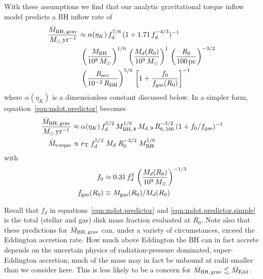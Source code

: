 \documentclass[11pt,a4paper]{article}
\begin{document}
With these assumptions we find that our analytic gravitational torque inflow model predicts a BH inflow rate of 
\begin{align}
\label{eqn:mdot.predictor}
\frac{\dot{M}_{\rm BH,\,grav}}{M_{\odot}\,{\rm yr^{-1}}} &\approx \alpha(\eta_{K}) \,  f_{d}^{7/6}\,(1+1.71\,f_{d}^{-4/3})^{-1}\,\\
                                                          \nonumber &\ \left( \frac{M_{\rm BH}}{10^{8}\,M_{\odot}} \right)^{1/6}\,     
                                                                                   \left( \frac{M_{d}(R_{0})}{10^{9}\,M_{\odot}} \right)^{1}\, 
                                                                                  \left( \frac{R_{0}}{100\,{\rm pc}} \right)^{-3/2}\,\\
                                                     \nonumber &\ \nonumber \left( \frac{R_{\rm acc}}{10^{-2}\,R_{\rm BH}} \right)^{5/6}\,      
                                                                                                {\left[1+\frac{f_{0}}{f_{\rm gas}(R_{0})}\right]^{-1}} \nonumber 
\end{align}
where $\alpha(\eta_K)$ is a dimensionless constant discussed below.
In a simpler form, equation~\ref{eqn:mdot.predictor} becomes
\begin{align}
    \label{eqn:mdot.predictor.simple}
  \frac{\dot{M}_{\rm BH,\,grav}}{M_{\odot}\,{\rm yr^{-1}}} 
                                & \approx  \alpha(\eta_K)\,  f_{d}^{5/2}\,   M_{\rm BH,\,8}^{1/6}\,M_{d,\,9}\,R_{0,\,100}^{-3/2}\,(1+f_{0}/f_{\rm gas})^{-1}  \\
  \dot{M}_{\rm torque} & \propto  e_{\rm T}            \;  f_{d}^{5/2}  \; M_{d}                  \;  R_{0}^{-3/2}   \; M_{\rm BH}^{1/6}
\end{align}
with
\begin{align}
    f_{0}                  &\approx 0.31\,f_{d}^{2}\,\left( \frac{M_{d}(R_0)}{10^{9}\,M_{\odot}} \right)^{-1/3} \\ 
  f_{\rm gas}(R_{0}) &\equiv M_{\rm gas}(R_{0}) / M_{d}(R_{0})
\label{eqn:mdot.predictor.fgas}
\end{align}



Recall that $f_d$ in equations~\ref{eqn:mdot.predictor} and
\ref{eqn:mdot.predictor.simple} is the total (stellar and gas) disk
mass fraction evaluated at $R_0$.  Note also that these predictions
for $\dot M_{\rm BH,\,grav}$ can, under a variety of circumstances,
exceed the Eddington accretion rate.  How much above Eddington the BH
can in fact accrete depends on the uncertain physics of
radiation-pressure dominated, super-Eddington accretion; much of the
mass may in fact be unbound at radii smaller than we consider here.
This is less likely to be a concern for $\dot M_{\rm BH,\,grav}
\lesssim \dot M_{\rm Edd}$.
\end{document}
